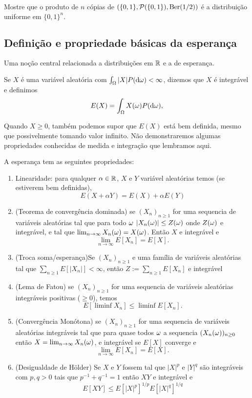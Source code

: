 \begin{exercise}
  Mostre que o produto de $n$ cópias de $(\{0,1\}, \mathcal{P}(\{0,1\}), \operatorname{Ber}(1/2))$ é a distribuição uniforme em $\{0,1\}^n$.
\end{exercise}


\subsection{Definição e propriedade básicas da esperança}

Uma noção central relacionada a distribuições em ${\mathbb R}$ e a de esperança.

\begin{definition}
  Se $X$ é uma variável aleatória com $\int_\Omega |X| P(\mathop{}\!\mathrm{d} \omega) < \infty$, dizemos que $X$ é integrável  e definimos
  \begin{equation}
    E(X) = \int_\Omega X(\omega) P(\mathop{}\!\mathrm{d} \omega),
  \end{equation}
\end{definition}

Quando $X \geq 0$, também podemos supor que $E(X)$ está bem definida, mesmo que possivelmente tomando valor infinito.
Não demonstraremos algumas propriedades conhecidas de medida e integração que lembramos aqui.

\begin{proposition}
 A esperança tem as seguintes propriedades:


\begin{enumerate}[\quad a)]
\item Linearidade: para qualquer $\alpha\in {\ensuremath{\mathbb R}}$, $X$ e $Y$ variável aleatórias temos (se estiverem bem definidas),
$$E(X + \alpha Y) = E(X) + \alpha E(Y)$$
\item (Teorema de convergência dominada) se $(X_n)_{n\ge 1}$ for uma sequencia de variáveis  aleatórias  tal que para todo $\omega$
$|X_n(\omega)|\le Z(\omega)$ onde $Z(\omega)$ e integrável, e tal que $\lim_{n\to \infty} X_n(\omega)=X(\omega)$.
Então $X$ e integrável e
$$\lim_{n\to \infty} E[X_n]=E[X].$$
 \item (Troca soma/esperança)Se $(X_n)_{n\ge 1}$ e uma família de variáveis aleatórias  tal que $\sum_{n\ge 1} E[|X_n|]<\infty$,
 então $Z:=\sum_{n\ge 1} E[X_n]$ e integrável
\item (Lema de Fatou)  se $(X_n)_{n\ge 1}$ for uma sequencia de variáveis  aleatórias  integráveis positivas ($\ge 0$), temos
$$E[\liminf X_n]\le \liminf E[X_n].$$
\item (Convergência Monótona)   se $(X_n)_{n\ge 1}$ for uma sequencia de variáveis  aleatórias  integráveis tal que
para quase todos $\omega$ a sequencia $(X_n(\omega))_{n\ge 0}$ então  $X=\lim_{n\to \infty} X_n(\omega)$, e integrável se $E[X]$ converge
e
$$\lim_{n\to \infty} E[X_n]=E[X].$$
\item (Desigualdade de H\"older) Se $X$ e $Y$ fossem tal que $|X|^p$ e $|Y|^q$ são integráveis com $p,q>0$ tais que $p^{-1}+q^{-1}=1$
então $XY$  e integrável e
$$E[XY]\le E[|X|^p]^{1/p} E[|X|^q]^{1/q}$$

\end{enumerate}
\end{proposition}

